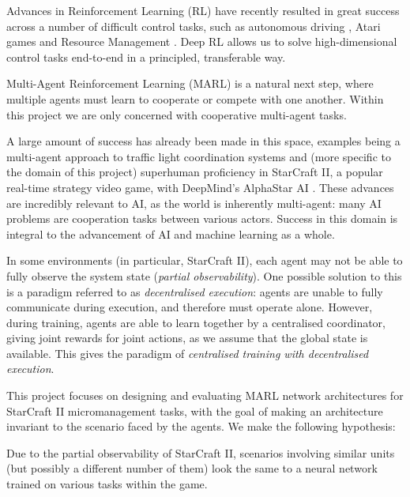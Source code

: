 Advances in Reinforcement Learning (RL) have recently resulted in great success across a number of difficult control tasks, such as autonomous driving \cite{driving}, Atari games \cite{dqn} and Resource Management \cite{resourcemanagement}. Deep RL allows us to solve high-dimensional control tasks end-to-end in a principled, transferable way.

Multi-Agent Reinforcement Learning (MARL) is a natural next step, where multiple agents must learn to cooperate or compete with one another. Within this project we are only concerned with cooperative multi-agent tasks. 

A large amount of success has already been made in this space, examples being a multi-agent approach to traffic light coordination systems \cite{traffic} and (more specific to the domain of this project) superhuman proficiency in StarCraft II, a popular real-time strategy video game, with DeepMind's AlphaStar AI \cite{alphastar}. These advances are incredibly relevant to AI, as the world is inherently multi-agent: many AI problems are cooperation tasks between various actors. Success in this domain is integral to the advancement of AI and machine learning as a whole.

In some environments (in particular, StarCraft II), each agent may not be able to fully observe the system state (\textit{partial observability}). One possible solution to this is a paradigm referred to as \textit{decentralised execution}: agents are unable to fully communicate during execution, and therefore must operate alone. However, during training, agents are able to learn together by a centralised coordinator, giving joint rewards for joint actions, as we assume that the global state is available. This gives the paradigm of \textit{centralised training with decentralised execution}.







This project focuses on designing and evaluating MARL network architectures for StarCraft II micromanagement tasks, with the goal of making an architecture invariant to the scenario faced by the agents. We make the following hypothesis:

\begin{hyp} \label{hyp:first}
Due to the partial observability of StarCraft II, scenarios involving similar units (but possibly a different number of them) look the same to a neural network trained on various tasks within the game.
\end{hyp}


